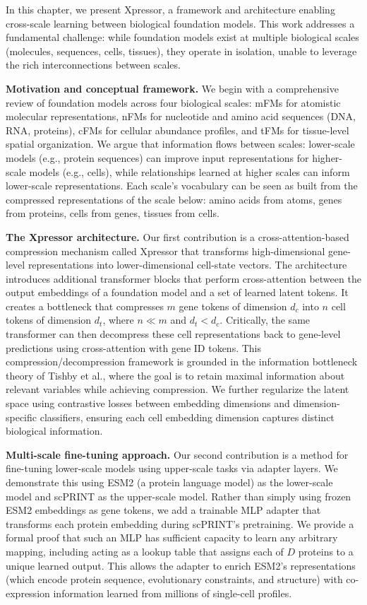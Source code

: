 In this chapter, we present Xpressor, a framework and architecture enabling cross-scale learning
between biological foundation models. This work addresses a fundamental challenge: while foundation
models exist at multiple biological scales (molecules, sequences, cells, tissues), they operate in
isolation, unable to leverage the rich interconnections between scales.

\textbf{Motivation and conceptual framework.} We begin with a comprehensive review of foundation
models across four biological scales: \glspl{mFM} for atomistic molecular representations,
\glspl{nFM} for nucleotide and amino acid sequences (\gls{DNA}, \gls{RNA}, proteins), \glspl{cFM}
for cellular abundance profiles, and \glspl{tFM} for tissue-level spatial organization. We argue
that information flows between scales: lower-scale models (e.g., protein sequences) can improve
input representations for higher-scale models (e.g., cells), while relationships learned at higher
scales can inform lower-scale representations. Each scale's vocabulary can be seen as built from
the compressed representations of the scale below: amino acids from atoms, genes from proteins,
cells from genes, tissues from cells.

\textbf{The Xpressor architecture.} Our first contribution is a cross-attention-based compression
mechanism called Xpressor that transforms high-dimensional gene-level representations into
lower-dimensional cell-state vectors. The architecture introduces additional transformer blocks
that perform cross-attention between the output embeddings of a foundation model and a set of
learned latent tokens. It creates a bottleneck that compresses \(m\) gene tokens of dimension
\(d_c\) into \(n\) cell tokens of dimension \(d_t\), where \(n \ll m\) and \(d_t < d_c\).
Critically, the same transformer can then decompress these cell representations back to gene-level
predictions using cross-attention with gene ID tokens. This compression/decompression framework is
grounded in the information bottleneck theory of Tishby et al., where the goal is to retain
maximal information about relevant variables while achieving compression. We further regularize the
latent space using contrastive losses between embedding dimensions and dimension-specific
classifiers, ensuring each cell embedding dimension captures distinct biological information.

\textbf{Multi-scale fine-tuning approach.} Our second contribution is a method for fine-tuning
lower-scale models using upper-scale tasks via adapter layers. We demonstrate this using \gls{ESM}2
(a protein language model) as the lower-scale model and \gls{scPRINT} as the upper-scale model.
Rather than simply using frozen \gls{ESM}2 embeddings as gene tokens, we add a trainable \gls{MLP}
adapter that transforms each protein embedding during \gls{scPRINT}'s pretraining. We provide a
formal proof that such an \gls{MLP} has sufficient capacity to learn any arbitrary
mapping, including acting as a lookup table that assigns each of \(D\) proteins to a unique
learned output. This allows the adapter to enrich \gls{ESM}2's representations (which encode
protein sequence, evolutionary constraints, and structure) with co-expression information learned
from millions of single-cell profiles.


